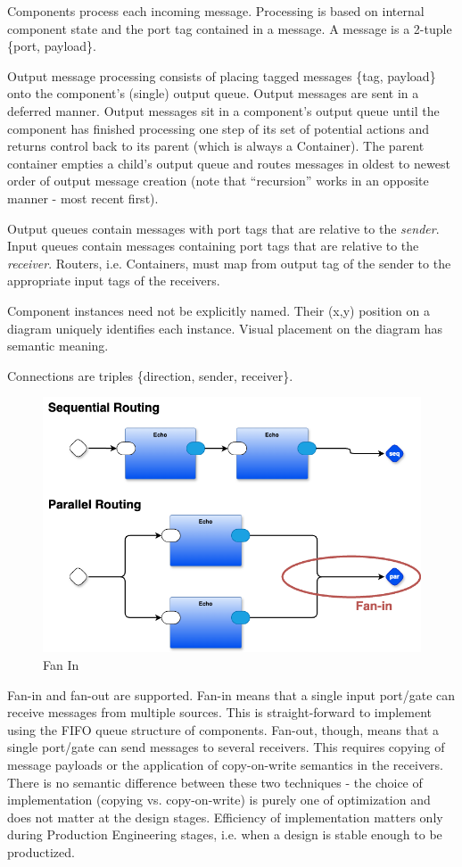 \documentclass[10pt,anonymous,review]{acmart}
\begin{document}
Components process each incoming message. Processing is based on internal component state and the port tag contained in a message. A message is a 2-tuple \{port, payload\}.

Output message processing consists of placing tagged messages \{tag, payload\} onto the component’s (single) output queue. Output messages are sent in a deferred manner. Output messages sit in a component’s output queue until the component has finished processing one step of its set of potential actions and returns control back to its parent (which is always a Container). The parent container empties a child’s output queue and routes messages in oldest to newest order of output message creation (note that “recursion” works in an opposite manner - most recent first).

Output queues contain messages with port tags that are relative to the \emph{sender}. Input queues contain messages containing port tags that are relative to the \emph{receiver}. Routers, i.e. Containers, must map from output tag of the sender to the appropriate input tags of the receivers.

Component instances need not be explicitly named. Their (x,y) position on a diagram uniquely identifies each instance. Visual placement on the diagram has semantic meaning.


Connections are triples \{direction, sender, receiver\}.


  \begin{figure}
    \includegraphics[scale=0.1]{./media/fanin.png}
    \caption{Fan In}
    \label{fanin}
  \end{figure}

Fan-in and fan-out are supported. Fan-in means that a single input port/gate can receive messages from multiple sources. This is straight-forward to implement using the FIFO queue structure of components. Fan-out, though, means that a single port/gate can send messages to several receivers. This requires copying of message payloads or the application of copy-on-write semantics in the receivers. There is no semantic difference between these two techniques - the choice of implementation (copying vs. copy-on-write) is purely one of optimization and does not matter at the design stages. Efficiency of implementation matters only during Production Engineering stages, i.e. when a design is stable enough to be productized.
\end{document}
